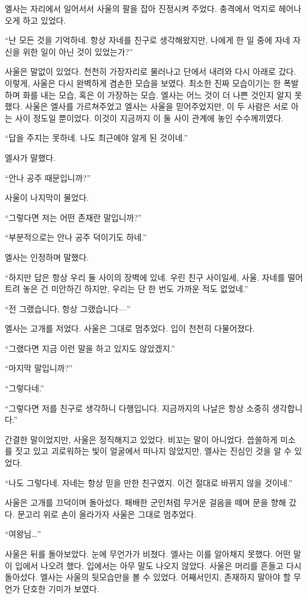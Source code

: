 엘사는 자리에서 일어서서 사울의 팔을 잡아 진정시켜 주었다. 충격에서 억지로 헤어나오게 하고 있었다.

``난 모든 것을 기억하네. 항상 자네를 친구로 생각해왔지만, 나에게 한 일 중에 자네 자신을 위한 일이 아닌 것이 있었는가?''

사울은 말없이 있었다. 천천히 가장자리로 물러나고 단에서 내려와 다시 아래로 갔다. 이렇게, 사울은 다시 완벽하게 겸손한 모습을 보였다. 최소한 진짜 모습이기는 한 폭발하며 화를 내는 모습, 혹은 이 가장하는 모습. 엘사는 어느 것이 더 나쁜 것인지 알지 못했다. 사울은 엘사를 가르쳐주었고 엘사는 사울을 믿어주었지만, 이 두 사람은 서로 아는 사이 정도일 뿐이었다. 이것이 지금까지 이 둘 사이 관계에 놓인 수수께끼였다.

``답을 주지는 못하네. 나도 최근에야 알게 된 것이네.''

엘사가 말했다.

``안나 공주 때문입니까?''

사울이 나지막이 물었다.

``그렇다면 저는 어떤 존재란 말입니까?''

``부분적으로는 안나 공주 덕이기도 하네.''

엘사는 인정하며 말했다.

``하지만 답은 항상 우리 둘 사이의 장벽에 있네. 우린 친구 사이일세, 사울. 자네를 떨어트려 놓은 건 미안하긴 하지만, 우리는 단 한 번도 가까운 적도 없었네.''

``전 그랬습니다, 항상 그랬습니다—''

엘사는 고개를 저었다. 사울은 그대로 멈추었다. 입이 천천히 다물어졌다.

``그랬다면 지금 이런 말을 하고 있지도 않았겠지.''

``마지막 말입니까?''

``그렇다네.''

``그렇다면 저를 친구로 생각하니 다행입니다. 지금까지의 나날은 항상 소중히 생각합니다.''

간결한 말이었지만, 사울은 정직해지고 있었다. 비꼬는 말이 아니었다. 씁쓸하게 미소를 짓고 있고 괴로워하는 빛이 얼굴에서 떠나지 않았지만, 엘사는 진심인 것을 알 수 있었다.

``나도 그렇다네. 자네는 항상 믿을 만한 친구였지. 이건 절대로 바뀌지 않을 것이네.''

사울은 고개를 끄덕이며 돌아섰다. 패배한 군인처럼 무거운 걸음을 떼며 문을 향해 갔다. 문고리 위로 손이 올라가자 사울은 그대로 멈추었다.

``여왕님\ldots''

사울은 뒤를 돌아보았다. 눈에 무언가가 비쳤다. 엘사는 이를 알아채지 못했다. 어떤 말이 입에서 나오려 했다. 입에서는 아무 말도 나오지 않았다. 사울은 머리를 흔들고 다시 돌아섰다. 엘사는 사울의 뒷모습만을 볼 수 있었다. 어째서인지, 존재하지 말아야 할 무언가 단호한 기미가 보였다.

